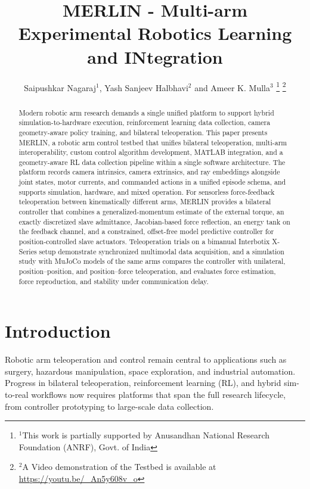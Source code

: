 \documentclass[a4paper, 10pt, conference]{ieeeconf}      %
\title{\LARGE \bf
MERLIN - Multi-arm Experimental Robotics Learning and INtegration
}
\author{Saipushkar Nagaraj$^{1}$, Yash Sanjeev Halbhavi$^{2}$ and Ameer K. Mulla$^{3}$%
\thanks{$^{1}$This work is partially supported by Anusandhan National Research Foundation (ANRF), Govt. of India}%
\thanks{$^{2}$A Video demonstration of the Testbed is available at \url{https://youtu.be/_An5y608v_o}}
}
\begin{document}
\maketitle
\thispagestyle{empty}
\pagestyle{empty}

\begin{abstract}
Modern robotic arm research demands a single unified platform to support hybrid simulation-to-hardware execution, reinforcement learning data collection, camera geometry-aware policy training, and bilateral teleoperation. This paper presents MERLIN, a robotic arm control testbed that unifies bilateral teleoperation, multi-arm interoperability, custom control algorithm development, MATLAB integration, and a geometry-aware RL data collection pipeline within a single software architecture. The platform records camera intrinsics, camera extrinsics, and ray embeddings alongside joint states, motor currents, and commanded actions in a unified episode schema, and supports simulation, hardware, and mixed operation. For sensorless force-feedback teleoperation between kinematically different arms, MERLIN provides a bilateral controller that combines a generalized-momentum estimate of the external torque, an exactly discretized slave admittance, Jacobian-based force reflection, an energy tank on the feedback channel, and a constrained, offset-free model predictive controller for position-controlled slave actuators. Teleoperation trials on a bimanual Interbotix X-Series setup demonstrate synchronized multimodal data acquisition, and a simulation study with MuJoCo models of the same arms compares the controller with unilateral, position--position, and position--force teleoperation, and evaluates force estimation, force reproduction, and stability under communication delay.
\end{abstract}

\section{Introduction}

Robotic arm teleoperation and control remain central to applications such as surgery, hazardous manipulation, space exploration, and industrial automation. Progress in bilateral teleoperation, reinforcement learning (RL), and hybrid sim-to-real workflows now requires platforms that span the full research lifecycle, from controller prototyping to large-scale data collection.
\end{document}
